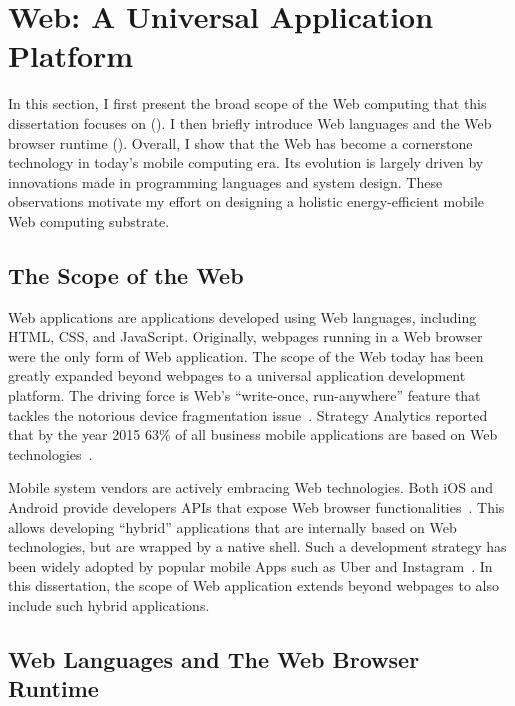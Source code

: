 
\chapter{Web: A Universal Application Platform}
\label{sec:background}

In this section, I first present the broad scope of the Web computing that this dissertation focuses on (). I then briefly introduce Web languages and the Web browser runtime (). Overall, I show that the Web has become a cornerstone technology in today's mobile computing era. Its evolution is largely driven by innovations made in programming languages and system design. These observations motivate my effort on designing a holistic energy-efficient mobile Web computing substrate.

\section{The Scope of the Web}
\label{sec:background:scope}

Web applications are applications developed using Web languages, including HTML, CSS, and JavaScript. Originally, webpages running in a Web browser were the only form of Web application. The scope of the Web today has been greatly expanded beyond webpages to a universal application development platform. The driving force is Web's ``write-once, run-anywhere'' feature that tackles the notorious device fragmentation issue~\cite{fragmentation}. Strategy Analytics reported that by the year 2015 63\% of all business mobile applications are based on Web technologies~\cite{html5rise}.

Mobile system vendors are actively embracing Web technologies. Both iOS and Android provide developers APIs that expose Web browser functionalities~\cite{uiwebview,webview}. This allows developing ``hybrid'' applications that are internally based on Web technologies, but are wrapped by a native shell. Such a development strategy has been widely adopted by popular mobile Apps such as Uber and Instagram~\cite{hybridapp}. In this dissertation, the scope of Web application extends beyond webpages to also include such hybrid applications.

\section{Web Languages and The Web Browser Runtime}
\label{sec:background:browser}

